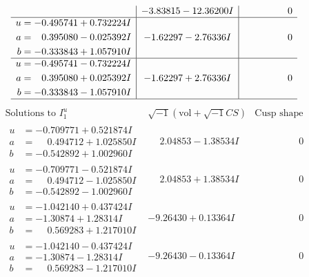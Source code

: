 \documentclass[1p]{elsarticle_modified}
\theoremstyle{definition}
\newcommand{\I}{\sqrt{-1}}
\begin{document}
$$\begin{array}{c|c|c}
 & -3.83815 - 12.36200 I & \phantom{-0.000000 } 0 \\ \hline\begin{aligned}
u &= -0.495741 + 0.732224 I \\
a &= \phantom{-}0.395080 - 0.025392 I \\
b &= -0.333843 + 1.057910 I\end{aligned}
 & -1.62297 - 2.76336 I & \phantom{-0.000000 } 0 \\ \hline\begin{aligned}
u &= -0.495741 - 0.732224 I \\
a &= \phantom{-}0.395080 + 0.025392 I \\
b &= -0.333843 - 1.057910 I\end{aligned}
 & -1.62297 + 2.76336 I & \phantom{-0.000000 } 0\\
 \hline 
 \end{array}$$\newpage$$\begin{array}{c|c|c}  
\text{Solutions to }I^u_{1}& \I (\text{vol} + \sqrt{-1}CS) & \text{Cusp shape}\\
 \hline 
\begin{aligned}
u &= -0.709771 + 0.521874 I \\
a &= \phantom{-}0.494712 + 1.025850 I \\
b &= -0.542892 + 1.002960 I\end{aligned}
 & \phantom{-}2.04853 - 1.38534 I & \phantom{-0.000000 } 0 \\ \hline\begin{aligned}
u &= -0.709771 - 0.521874 I \\
a &= \phantom{-}0.494712 - 1.025850 I \\
b &= -0.542892 - 1.002960 I\end{aligned}
 & \phantom{-}2.04853 + 1.38534 I & \phantom{-0.000000 } 0 \\ \hline\begin{aligned}
u &= -1.042140 + 0.437424 I \\
a &= -1.30874 + 1.28314 I \\
b &= \phantom{-}0.569283 + 1.217010 I\end{aligned}
 & -9.26430 + 0.13364 I & \phantom{-0.000000 } 0 \\ \hline\begin{aligned}
u &= -1.042140 - 0.437424 I \\
a &= -1.30874 - 1.28314 I \\
b &= \phantom{-}0.569283 - 1.217010 I\end{aligned}
 & -9.26430 - 0.13364 I & \phantom{-0.000000 } 0 \\ \hline\begin{aligned}

\end{aligned}
\end{array}$$
\end{document}
